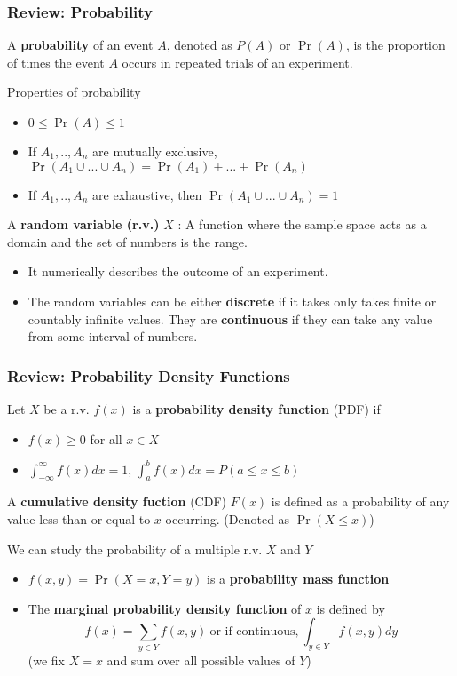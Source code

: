 \documentclass[aspectratio=169]{beamer}
\newenvironment{wideitemize}{\itemize\addtolength{\itemsep}{10pt}}{\enditemize}
\begin{document}
\begin{frame}
\frametitle{Review: Probability}
\begin{wideitemize}
\item A \textbf{probability} of an event $A$, denoted as $P(A)$ or $\Pr(A)$, is the proportion of times the event $A$ occurs in repeated trials of an experiment.
\begin{block}{Properties of probability}
\begin{itemize}
\item $0\leq\Pr(A)\leq1$
\item If $A_1,..,A_n$ are mutually exclusive, $\Pr(A_1\cup ... \cup A_n)=\Pr(A_1)+...+\Pr(A_n)$
\item If $A_1,..,A_n$ are exhaustive, then $\Pr(A_1\cup ... \cup A_n)=1$
\end{itemize} 
\end{block}
\item A \textbf{random variable (r.v.)} $X$ : A function where the sample space acts as a domain and the set of numbers is the range. 
\begin{itemize}
\item It numerically describes the outcome of an experiment. 
\item The random variables can be either \textbf{discrete} if it takes only takes finite or countably infinite values. They are \textbf{continuous} if they can take any value from some interval of numbers. 
\end{itemize}
\end{wideitemize}
\end{frame}

\begin{frame}
\frametitle{Review: Probability Density Functions}
\begin{wideitemize}
\item Let $X$ be a r.v. $f(x)$ is a  \textbf{probability density function} (PDF) if 
\begin{itemize}
\item $f(x)\geq 0$ for all $x\in X$
\item $\int_{-\infty}^\infty f(x)dx=1$, $\int_{a}^b f(x)dx=P(a\leq x \leq b)$
\end{itemize}
\item A \textbf{cumulative density fuction} (CDF) $F(x)$ is defined as a probability of any value less than or equal to $x$ occurring. (Denoted as $\Pr(X\leq x)$)
\item We can study the probability of a multiple r.v. $X$ and $Y$ 
\begin{itemize}
\item $f(x,y) = \Pr(X=x, Y=y)$ is a \textbf{probability mass function}
\item The \textbf{marginal probability density function} of $x$ is defined by
\[
f(x) = \sum_{y\in Y}f(x,y) \ \text{or if continuous,} \ \int_{y\in Y}f(x,y)dy 
\]
(we fix $X=x$ and sum over all possible values of $Y$)
\end{itemize}
\end{wideitemize}
\end{frame}
\end{document}
